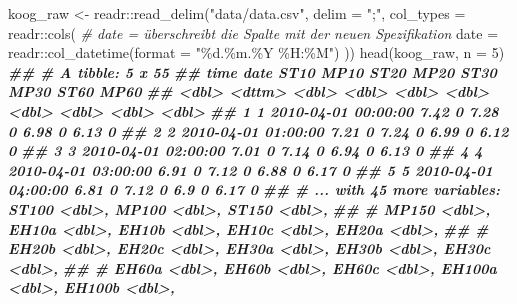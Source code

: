 \documentclass[
]{article}
\newenvironment{Shaded}{\begin{snugshade}}{\end{snugshade}}
\newcommand{\AttributeTok}[1]{\textcolor[rgb]{0.77,0.63,0.00}{#1}}
\newcommand{\CommentTok}[1]{\textcolor[rgb]{0.56,0.35,0.01}{\textit{#1}}}
\newcommand{\DecValTok}[1]{\textcolor[rgb]{0.00,0.00,0.81}{#1}}
\newcommand{\DocumentationTok}[1]{\textcolor[rgb]{0.56,0.35,0.01}{\textbf{\textit{#1}}}}
\newcommand{\FunctionTok}[1]{\textcolor[rgb]{0.00,0.00,0.00}{#1}}
\newcommand{\NormalTok}[1]{#1}
\newcommand{\OtherTok}[1]{\textcolor[rgb]{0.56,0.35,0.01}{#1}}
\newcommand{\SpecialCharTok}[1]{\textcolor[rgb]{0.00,0.00,0.00}{#1}}
\newcommand{\StringTok}[1]{\textcolor[rgb]{0.31,0.60,0.02}{#1}}
\begin{document}
\begin{Shaded}
\begin{Highlighting}[]
\NormalTok{koog\_raw }\OtherTok{\textless{}{-}}\NormalTok{ readr}\SpecialCharTok{::}\FunctionTok{read\_delim}\NormalTok{(}\StringTok{"data/data.csv"}\NormalTok{, }\AttributeTok{delim =} \StringTok{";"}\NormalTok{, }
                          \AttributeTok{col\_types =}\NormalTok{ readr}\SpecialCharTok{::}\FunctionTok{cols}\NormalTok{(}
                            \CommentTok{\# date = überschreibt die Spalte mit der neuen Spezifikation}
                            \AttributeTok{date =}\NormalTok{ readr}\SpecialCharTok{::}\FunctionTok{col\_datetime}\NormalTok{(}\AttributeTok{format =} \StringTok{"\%d.\%m.\%Y \%H:\%M"}\NormalTok{) }
\NormalTok{  ))}
\FunctionTok{head}\NormalTok{(koog\_raw, }\AttributeTok{n =} \DecValTok{5}\NormalTok{)}
\DocumentationTok{\#\# \# A tibble: 5 x 55}
\DocumentationTok{\#\#    time date                 ST10  MP10  ST20  MP20  ST30  MP30  ST60  MP60}
\DocumentationTok{\#\#   \textless{}dbl\textgreater{} \textless{}dttm\textgreater{}              \textless{}dbl\textgreater{} \textless{}dbl\textgreater{} \textless{}dbl\textgreater{} \textless{}dbl\textgreater{} \textless{}dbl\textgreater{} \textless{}dbl\textgreater{} \textless{}dbl\textgreater{} \textless{}dbl\textgreater{}}
\DocumentationTok{\#\# 1     1 2010{-}04{-}01 00:00:00  7.42     0  7.28     0  6.98     0  6.13     0}
\DocumentationTok{\#\# 2     2 2010{-}04{-}01 01:00:00  7.21     0  7.24     0  6.99     0  6.12     0}
\DocumentationTok{\#\# 3     3 2010{-}04{-}01 02:00:00  7.01     0  7.14     0  6.94     0  6.13     0}
\DocumentationTok{\#\# 4     4 2010{-}04{-}01 03:00:00  6.91     0  7.12     0  6.88     0  6.17     0}
\DocumentationTok{\#\# 5     5 2010{-}04{-}01 04:00:00  6.81     0  7.12     0  6.9      0  6.17     0}
\DocumentationTok{\#\# \# ... with 45 more variables: ST100 \textless{}dbl\textgreater{}, MP100 \textless{}dbl\textgreater{}, ST150 \textless{}dbl\textgreater{},}
\DocumentationTok{\#\# \#   MP150 \textless{}dbl\textgreater{}, EH10a \textless{}dbl\textgreater{}, EH10b \textless{}dbl\textgreater{}, EH10c \textless{}dbl\textgreater{}, EH20a \textless{}dbl\textgreater{},}
\DocumentationTok{\#\# \#   EH20b \textless{}dbl\textgreater{}, EH20c \textless{}dbl\textgreater{}, EH30a \textless{}dbl\textgreater{}, EH30b \textless{}dbl\textgreater{}, EH30c \textless{}dbl\textgreater{},}
\DocumentationTok{\#\# \#   EH60a \textless{}dbl\textgreater{}, EH60b \textless{}dbl\textgreater{}, EH60c \textless{}dbl\textgreater{}, EH100a \textless{}dbl\textgreater{}, EH100b \textless{}dbl\textgreater{},}

\end{Highlighting}
\end{Shaded}
\end{document}
